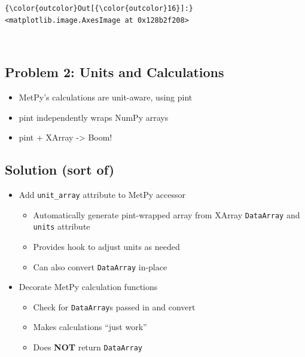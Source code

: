 \documentclass[11pt]{article}
\providecommand{\tightlist}{%
      \setlength{\itemsep}{0pt}\setlength{\parskip}{0pt}}
\begin{document}
\begin{Verbatim}[commandchars=\\\{\}]
{\color{outcolor}Out[{\color{outcolor}16}]:} <matplotlib.image.AxesImage at 0x128b2f208>
\end{Verbatim}
            
    \begin{center}
    \end{center}
    { \hspace*{\fill} \\}
    
    \hypertarget{problem-2-units-and-calculations}{%
\subsection{Problem 2: Units and
Calculations}\label{problem-2-units-and-calculations}}

\begin{itemize}
\tightlist
\item
  MetPy's calculations are unit-aware, using pint
\item
  pint independently wraps NumPy arrays
\item
  pint + XArray -\textgreater{} Boom!
\end{itemize}

    \hypertarget{solution-sort-of}{%
\subsection{Solution (sort of)}\label{solution-sort-of}}

\begin{itemize}
\tightlist
\item
  Add \texttt{unit\_array} attribute to MetPy accessor

  \begin{itemize}
  \tightlist
  \item
    Automatically generate pint-wrapped array from XArray
    \texttt{DataArray} and \texttt{units} attribute
  \item
    Provides hook to adjust units as needed
  \item
    Can also convert \texttt{DataArray} in-place
  \end{itemize}
\item
  Decorate MetPy calculation functions

  \begin{itemize}
  \tightlist
  \item
    Check for \texttt{DataArray}s passed in and convert
  \item
    Makes calculations ``just work''
  \item
    Does \textbf{NOT} return \texttt{DataArray}
  \end{itemize}
\end{itemize}
\end{document}
